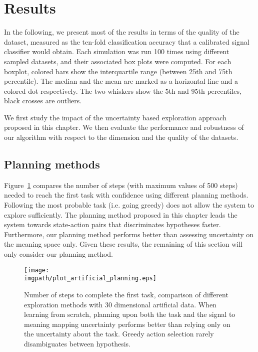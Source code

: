 \section{Results}

In the following, we present most of the results in terms of the quality of the dataset, measured as the ten-fold classification accuracy that a calibrated signal classifier would obtain. Each simulation was run 100 times using different sampled datasets, and their associated box plots were computed. For each boxplot, colored bars show the interquartile range (between 25th and 75th percentile). The median and the mean are marked as a horizontal line and a colored dot respectively. The two whiskers show the 5th and 95th percentiles, black crosses are outliers. 

We first study the impact of the uncertainty based exploration approach proposed in this chapter. We then evaluate the performance and robustness of our algorithm with respect to the dimension and the quality of the datasets.

\subsection{Planning methods}

Figure~\ref{fig:artificialplanning} compares the number of steps (with maximum values of 500 steps) needed to reach the first task with confidence using different planning methods. Following the most probable task (i.e. going greedy) does not allow the system to explore sufficiently. The planning method proposed in this chapter leads the system towards state-action pairs that discriminates hypotheses faster. Furthermore, our planning method performs better than assessing uncertainty on the meaning space only. Given these results, the remaining of this section will only consider our planning method.

\begin{figure}[!htbp]
  \centering
      \texttt{[image: \\imgpath/plot\_artificial\_planning.eps]}
      \caption{Number of steps to complete the first task, comparison of different exploration methods with 30 dimensional artificial data. When learning from scratch, planning upon both the task and the signal to meaning mapping uncertainty performs better than relying only on the uncertainty about the task. Greedy action selection rarely disambiguates between hypothesis.}
    \label{fig:artificialplanning}
\end{figure}

